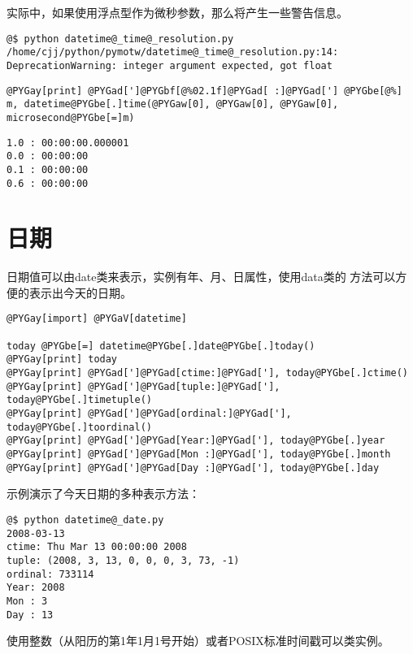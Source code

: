 \documentclass[a4paper,10pt,english]{manual}
\begin{document}
实际中，如果使用浮点型作为微秒参数，那么将产生一些警告信息。

\begin{Verbatim}[commandchars=@\[\]]
@$ python datetime@_time@_resolution.py
/home/cjj/python/pymotw/datetime@_time@_resolution.py:14: DeprecationWarning: integer argument expected, got float
\end{Verbatim}

\begin{Verbatim}[commandchars=@\[\]]
@PYGay[print] @PYGad[']@PYGbf[@%02.1f]@PYGad[ :]@PYGad['] @PYGbe[@%] m, datetime@PYGbe[.]time(@PYGaw[0], @PYGaw[0], @PYGaw[0], microsecond@PYGbe[=]m)
\end{Verbatim}

\begin{Verbatim}[commandchars=@\[\]]
1.0 : 00:00:00.000001
0.0 : 00:00:00
0.1 : 00:00:00
0.6 : 00:00:00
\end{Verbatim}


\section{日期}

日期值可以由date类来表示，实例有年、月、日属性，使用data类的  方法可以方便的表示出今天的日期。

\begin{Verbatim}[commandchars=@\[\]]
@PYGay[import] @PYGaV[datetime]

today @PYGbe[=] datetime@PYGbe[.]date@PYGbe[.]today()
@PYGay[print] today
@PYGay[print] @PYGad[']@PYGad[ctime:]@PYGad['], today@PYGbe[.]ctime()
@PYGay[print] @PYGad[']@PYGad[tuple:]@PYGad['], today@PYGbe[.]timetuple()
@PYGay[print] @PYGad[']@PYGad[ordinal:]@PYGad['], today@PYGbe[.]toordinal()
@PYGay[print] @PYGad[']@PYGad[Year:]@PYGad['], today@PYGbe[.]year
@PYGay[print] @PYGad[']@PYGad[Mon :]@PYGad['], today@PYGbe[.]month
@PYGay[print] @PYGad[']@PYGad[Day :]@PYGad['], today@PYGbe[.]day
\end{Verbatim}

示例演示了今天日期的多种表示方法：

\begin{Verbatim}[commandchars=@\[\]]
@$ python datetime@_date.py
2008-03-13
ctime: Thu Mar 13 00:00:00 2008
tuple: (2008, 3, 13, 0, 0, 0, 3, 73, -1)
ordinal: 733114
Year: 2008
Mon : 3
Day : 13
\end{Verbatim}

使用整数（从阳历的第1年1月1号开始）或者POSIX标准时间戳可以类实例。
\end{document}
